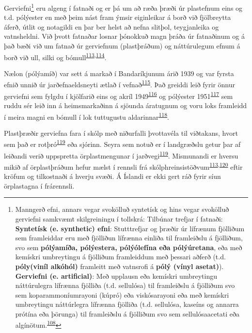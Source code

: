 \documentclass[icelandic,]{book}
\let\rmarkdownfootnote\footnote%
\def\footnote{\protect\rmarkdownfootnote}
\begin{document}
Gerviefni\footnote{Manngerð efni, annars vegar svokölluð syntetísk og hins vegar svokölluð gerviefni samkvæmt skilgreiningu í tollskrá: Tilbúnar trefjar í fatnaði: \textbf{Syntetísk (e. synthetic) efni}: Stutttrefjar og þræðir úr lífrænum fjölliðum sem framleiddar eru með fjölliðun lífrænna einliða til framleiðslu á fjölliðum, svo sem \textbf{pólýamíða, pólýestera, pólýólefína eða pólýúretana}, eða með kemískri umbreytingu á fjölliðum framleiddum með þessari aðferð (t.d. \textbf{póly(viníl alkóhól)} framleitt með vatnsrofi á \textbf{pólý (vínyl asetat)}).
  \textbf{Gerviefni (e. artificial)}: Með upplausn eða kemískri umbreytingu náttúrulegra lífrænna fjölliða (t.d. sellulósa) til framleiðslu á fjölliðum svo sem koparammoníumrayoni (kúpró) eða viskósarayoni eða með kemískri umbreytingu náttúrlegra lífrænna fjölliða (t.d. sellulósa, kaseíns og annarra prótína eða þörunga) til framleiðslu á fjölliðum svo sem sellulósaacetati eða algínötum.\textsuperscript{\protect\hyperlink{ref-tollur2017}{108}}} eru algeng í fatnaði og er þá um að ræða þræði úr plastefnum eins og t.d. pólýester en með þeim nást fram ýmsir eiginleikar á borð við fjölbreytta áferð, útlit og notagildi en þar ber helst að nefna slitþol, teygjanleika og vatnsheldni. Við þvott fatnaðar losnar þónokkuð magn þráða úr fatnaðinum og á það bæði við um fatnað úr gerviefnum (plastþráðum) og náttúrulegum efnum á borð við ull, silki og bómull\textsuperscript{\protect\hyperlink{ref-magnusson2014mikroskrap}{113},\protect\hyperlink{ref-magnusson2014mikroskopiska}{114}}.

Nælon (pólýamíð) var sett á markað í Bandaríkjunum árið 1939 og var fyrsta efnið unnið úr jarðefnaeldsneyti ætlað í vefnað\textsuperscript{\protect\hyperlink{ref-AmericanChemicalSociety1995}{115}}. Það greiddi leið fyrir önnur gerviefni sem fylgdu í kjölfarið eins og akríl 1949\textsuperscript{\protect\hyperlink{ref-masson1995acrylic}{116}} og pólýester 1951\textsuperscript{\protect\hyperlink{ref-brunnschweiler1993polyester}{117}} sem ruddu sér leið inn á heimsmarkaðinn á sjöunda áratugnum og voru loks framleidd í meira magni en bómull í lok tuttugustu aldarinnar\textsuperscript{\protect\hyperlink{ref-Shen2012}{118}}.

Plastþræðir gerviefna fara í skólp með niðurfalli þvottavéla til viðtakans, hvort sem það er rotþró\textsuperscript{\protect\hyperlink{ref-mahon2016microplastics}{119}} eða sjórinn. Seyra sem notuð er í landgræðslu getur þar af leiðandi verið uppspretta örplastmengunar í jarðvegi\textsuperscript{\protect\hyperlink{ref-mahon2016microplastics}{119}}. Mismunandi er hversu mikið af örplastþráðum hefur mælst í rennsli frá skólphreinsistöðvum\textsuperscript{\protect\hyperlink{ref-magnusson2014mikroskrap}{113},\protect\hyperlink{ref-napper2016release}{120}} eftir kröfum og tilkostnaði á hverju svæði. Á Íslandi er ekki gert ráð fyrir síun örplastagna í frárennsli.
\end{document}
